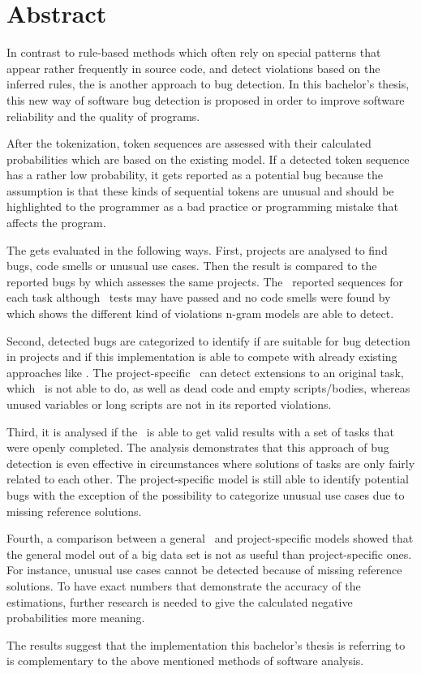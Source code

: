 \chapter*{Abstract}

In contrast to rule-based methods which often rely on special patterns that appear rather frequently in source code, and detect violations based on the inferred rules, the \ngram{} is another approach to bug detection. In this bachelor's thesis, this new way of software bug detection is proposed in order to improve software reliability and the quality of \scratch{} programs.

After the tokenization, token sequences are assessed with their calculated probabilities which are based on the existing model. If a detected token sequence has a rather low probability, it gets reported as a potential bug because the assumption is that these kinds of sequential tokens are unusual and should be highlighted to the programmer as a bad practice or programming mistake that affects the program.

The \ngram{} gets evaluated in the following ways. First, \scratch{} projects are analysed to find bugs, code smells or unusual use cases. Then the result is compared to the reported bugs by \litterbox{} which assesses the same projects. The \ngram\ reported sequences for each task although \whisker\ tests may have passed and no code smells were found by \litterbox{} which shows the different kind of violations n-gram models are able to detect.

Second, detected bugs are categorized to identify if  are suitable for bug detection in \scratch{} projects and if this implementation is able to compete with already existing approaches like \litterbox{}. The project-specific \ngram\ can detect extensions to an original task, which \litterbox\ is not able to do, as well as dead code and empty scripts/bodies, whereas unused variables or long scripts are not in its reported violations.  

Third, it is analysed if the \ngram\ is able to get valid results with a set of tasks that were openly completed. The analysis demonstrates that this approach of bug detection is even effective in circumstances where solutions of tasks are only fairly related to each other. The project-specific model is still able to identify potential bugs with the exception of the possibility to categorize unusual use cases due to missing reference solutions.

Fourth, a comparison between a general \ngram\ and project-specific models showed that the general model out of a big data set is not as useful than project-specific ones. For instance, unusual use cases cannot be detected because of missing reference solutions. To have exact numbers that demonstrate the accuracy of the estimations, further research is needed to give the calculated negative probabilities more meaning. 

The results suggest that the implementation this bachelor's thesis is referring to is complementary to the above mentioned methods of software analysis.

